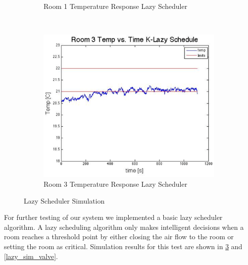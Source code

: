 \documentclass[a4paper,10pt,twocolumn]{article}
\begin{document}
\begin{figure}[b!]
\begin{subfigure}[b]{\linewidth}
                \caption{Room 1 Temperature Response Lazy Scheduler}
                \label{k_lazy_rm1_temp}
        \end{subfigure}
	\\
        \begin{subfigure}[b]{\linewidth}
                \centering
                \includegraphics[width=\linewidth]{k_lazy_rm3_temp}
                \caption{Room 3 Temperature Response Lazy Scheduler}
                \label{k_lazy_rm3_temp}
        \end{subfigure}

        \caption{Lazy Scheduler Simulation}\label{lazy_sim}
\end{figure}

For further testing of our system we implemented a basic lazy scheduler algorithm.  A lazy scheduling algorithm only makes intelligent decisions when a room reaches a threshold point by either closing the air flow to the room or setting the room as critical.  Simulation results for this test are shown in \ref{lazy_sim} and \ref{lazy_sim_valve}.
\end{document}
